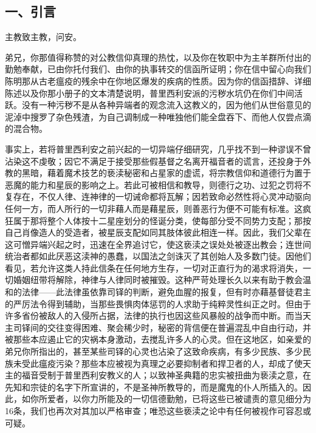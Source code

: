 
\subsection{一、引言}

主教致主教，问安。\par

弟兄，你那值得称赞的对公教信仰真理的热忱，以及你在牧职中为主羊群所付出的勤勉奉献，已由你托付我们、由你的执事转交的信函所证明；你在信中留心向我们陈明那从古老瘟疫的残余中在你地区爆发的疾病的性质。因为你的信函措辞、详细陈述以及你那小册子的文本清楚说明，普里西利安派的污秽水坑仍在你们中间活跃。没有一种污秽不是从各种异端者的观念流入这教义的，因为他们从世俗意见的泥淖中搜罗了杂色残渣，为自己调制成一种唯独他们能全盘吞下、而他人仅尝点滴的混合物。\par

事实上，若将普里西利安之前兴起的一切异端仔细研究，几乎找不到一种谬误不曾沾染这不虔敬；因它不满足于接受那些假基督之名离开福音者的谎言，还投身于外教的黑暗，藉着魔术技艺的亵渎秘密和占星家的虚谎，将宗教信仰和道德行为置于恶魔的能力和星辰的影响之上。若此可被相信和教导，则德行之功、过犯之罚将不复存在，不仅人律、连神律的一切诫命都将瓦解；因若致命必然性将心灵冲动驱向任何一方，而人所行的一切非藉人而是藉星辰，则善恶行为便不可能有标准。这疯狂属于那将整个人体按十二星座划分的怪诞分类，使每部分受不同势力支配；那按自己肖像造人的受造者，被星辰支配如同其肢体彼此相连一样。因此，我们父辈在这可憎异端兴起之时，迅速在全界追讨它，使这亵渎之误处处被逐出教会；连世间统治者都如此厌恶这渎神的愚蠢，以国法之剑诛灭了其创始人及多数门徒。因他们看见，若允许这类人持此信条在任何地方生存，一切对正直行为的渴求将消失，一切婚姻纽带将解除，神律与人律同时被摧毁。这种严苛处理长久以来有助于教会温和的法律——此法律虽依靠司铎的判断，避免血腥的报复，但有时亦藉基督徒君主的严厉法令得到辅助，当那些畏惧肉体惩罚的人求助于纯粹灵性纠正之时。但由于许多省份被敌人的入侵所占据，法律的执行也因这些风暴般的战争而中断。而当天主司铎间的交往变得困难、聚会稀少时，秘密的背信便在普遍混乱中自由行动，并被那些本应遏止它的灾祸本身激动，去搅乱许多人的心灵。但在这地区，如亲爱的弟兄你所指出的，甚至某些司铎的心灵也沾染了这致命疾病，有多少民族、多少民族未受此瘟疫污染？那些本应被视为真理之必要抑制者和捍卫者的人，却成了使天主的福音受制于普里西利安教义的人；以致神圣典籍的忠实被扭曲为亵渎之意，在先知和宗徒的名字下所宣讲的，不是圣神所教导的，而是魔鬼的仆人所插入的。因此，如你所爱者，以你力所能及的一切信德勤勉，已将这些已被谴责的意见细分为16条，我们也再次对其加以严格审查；唯恐这些亵渎之论中有任何被视作可容忍或可疑。\par

